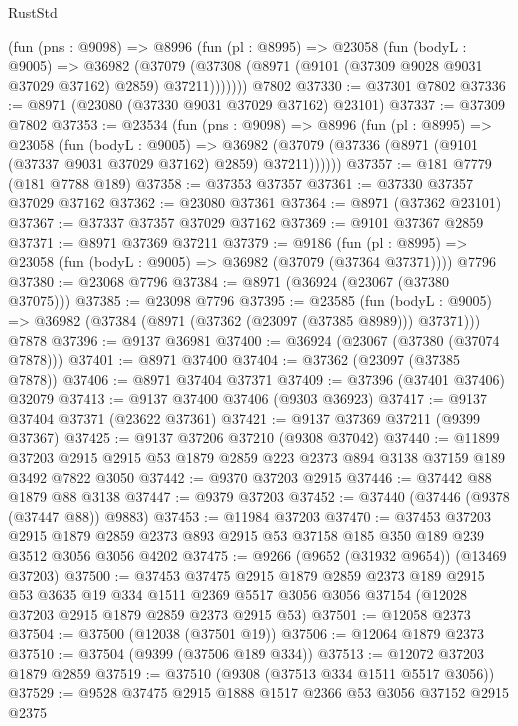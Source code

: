 \begin{lexlean}{RustStd}
\begin{coremodule}
      (fun (pns : @9098) =>
      @8996
        (fun (pl : @8995) =>
        @23058
          (fun (bodyL : @9005) =>
          @36982
            (@37079 (@37308 (@8971 (@9101 (@37309 @9028 @9031 @37029 @37162) @2859) @37211)))))))
    @7802
@37330 := @37301 @7802
@37336 := @8971 (@23080 (@37330 @9031 @37029 @37162) @23101)
@37337 := @37309 @7802
@37353 := @23534
    (fun (pns : @9098) =>
    @8996
      (fun (pl : @8995) =>
      @23058
        (fun (bodyL : @9005) =>
        @36982 (@37079 (@37336 (@8971 (@9101 (@37337 @9031 @37029 @37162) @2859) @37211))))))
@37357 := @181 @7779 (@181 @7788 @189)
@37358 := @37353 @37357
@37361 := @37330 @37357 @37029 @37162
@37362 := @23080 @37361
@37364 := @8971 (@37362 @23101)
@37367 := @37337 @37357 @37029 @37162
@37369 := @9101 @37367 @2859
@37371 := @8971 @37369 @37211
@37379 := @9186
    (fun (pl : @8995) => @23058 (fun (bodyL : @9005) => @36982 (@37079 (@37364 @37371))))
    @7796
@37380 := @23068 @7796
@37384 := @8971 (@36924 (@23067 (@37380 @37075)))
@37385 := @23098 @7796
@37395 := @23585
    (fun (bodyL : @9005) => @36982 (@37384 (@8971 (@37362 (@23097 (@37385 @8989))) @37371)))
    @7878
@37396 := @9137 @36981
@37400 := @36924 (@23067 (@37380 (@37074 @7878)))
@37401 := @8971 @37400
@37404 := @37362 (@23097 (@37385 @7878))
@37406 := @8971 @37404 @37371
@37409 := @37396 (@37401 @37406) @32079
@37413 := @9137 @37400 @37406 (@9303 @36923)
@37417 := @9137 @37404 @37371 (@23622 @37361)
@37421 := @9137 @37369 @37211 (@9399 @37367)
@37425 := @9137 @37206 @37210 (@9308 @37042)
@37440 := @11899
    @37203
    @2915
    @2915
    @53
    @1879
    @2859
    @223
    @2373
    @894
    @3138
    @37159
    @189
    @3492
    @7822
    @3050
@37442 := @9370 @37203 @2915
@37446 := @37442 @88 @1879 @88 @3138
@37447 := @9379 @37203
@37452 := @37440 (@37446 (@9378 (@37447 @88)) @9883)
@37453 := @11984 @37203
@37470 := @37453
    @37203
    @2915
    @1879
    @2859
    @2373
    @893
    @2915
    @53
    @37158
    @185
    @350
    @189
    @239
    @3512
    @3056
    @3056
    @4202
@37475 := @9266 (@9652 (@31932 @9654)) (@13469 @37203)
@37500 := @37453
    @37475
    @2915
    @1879
    @2859
    @2373
    @189
    @2915
    @53
    @3635
    @19
    @334
    @1511
    @2369
    @5517
    @3056
    @3056
    @37154
    (@12028 @37203 @2915 @1879 @2859 @2373 @2915 @53)
@37501 := @12058 @2373
@37504 := @37500 (@12038 (@37501 @19))
@37506 := @12064 @1879 @2373
@37510 := @37504 (@9399 (@37506 @189 @334))
@37513 := @12072 @37203 @1879 @2859
@37519 := @37510 (@9308 (@37513 @334 @1511 @5517 @3056))
@37529 := @9528 @37475 @2915 @1888 @1517 @2366 @53 @3056 @37152 @2915 @2375

\end{coremodule}
\end{lexlean}
